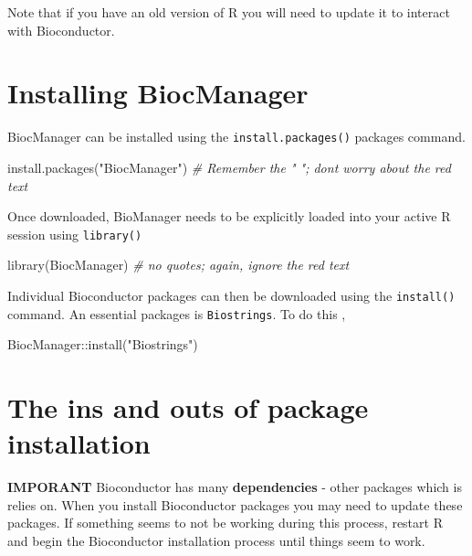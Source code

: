\documentclass[
]{book}
\newenvironment{Shaded}{\begin{snugshade}}{\end{snugshade}}
\newcommand{\CommentTok}[1]{\textcolor[rgb]{0.56,0.35,0.01}{\textit{#1}}}
\newcommand{\FunctionTok}[1]{\textcolor[rgb]{0.00,0.00,0.00}{#1}}
\newcommand{\NormalTok}[1]{#1}
\newcommand{\SpecialCharTok}[1]{\textcolor[rgb]{0.00,0.00,0.00}{#1}}
\newcommand{\StringTok}[1]{\textcolor[rgb]{0.31,0.60,0.02}{#1}}
\begin{document}
Note that if you have an old version of R you will need to update it to interact with Bioconductor.

\hypertarget{installing-biocmanager}{%
\section{Installing BiocManager}\label{installing-biocmanager}}

BiocManager can be installed using the \texttt{install.packages()} packages command.

\begin{Shaded}
\begin{Highlighting}[]
\FunctionTok{install.packages}\NormalTok{(}\StringTok{"BiocManager"}\NormalTok{) }\CommentTok{\# Remember the "  "; don\textquotesingle{}t worry about the red text}
\end{Highlighting}
\end{Shaded}

Once downloaded, BioManager needs to be explicitly loaded into your active R session using \texttt{library()}

\begin{Shaded}
\begin{Highlighting}[]
\FunctionTok{library}\NormalTok{(BiocManager) }\CommentTok{\# no quotes; again, ignore the red text}
\end{Highlighting}
\end{Shaded}

Individual Bioconductor packages can then be downloaded using the \texttt{install()} command. An essential packages is \texttt{Biostrings}. To do this ,

\begin{Shaded}
\begin{Highlighting}[]
\NormalTok{BiocManager}\SpecialCharTok{::}\FunctionTok{install}\NormalTok{(}\StringTok{"Biostrings"}\NormalTok{)}
\end{Highlighting}
\end{Shaded}

\hypertarget{the-ins-and-outs-of-package-installation}{%
\section{The ins and outs of package installation}\label{the-ins-and-outs-of-package-installation}}

\textbf{IMPORANT} Bioconductor has many \textbf{dependencies} - other packages which is relies on. When you install Bioconductor packages you may need to update these packages. If something seems to not be working during this process, restart R and begin the Bioconductor installation process until things seem to work.
\end{document}
